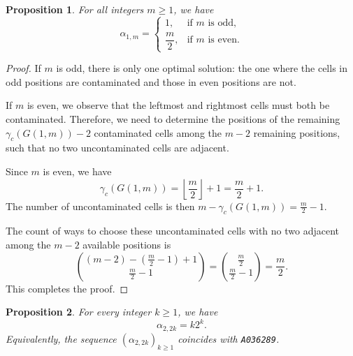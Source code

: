 \documentclass[letterpaper,12pt]{article}
\newtheorem{proposition}{Proposition}
\begin{document}
\begin{proposition}\label{proposition_nmbr_opt_solution}
For all integers $m \geq 1$, we have
\begin{equation}
        \alpha_{1,m} =
    \begin{cases}
        1, & \text{if $m$ is odd}, \\[4pt]
        \dfrac{m}{2}, & \text{if $m$ is even}.
    \end{cases}
\end{equation}
\end{proposition}

\begin{proof}
If $m$ is odd, there is only one optimal solution: the one where the cells in odd positions are contaminated and those in even positions are not.

If $m$ is even, we observe that the leftmost and rightmost cells must both be contaminated. Therefore, we need to determine the positions of the remaining $\gamma_c(G(1,m)) - 2$ contaminated cells among the $m - 2$ remaining positions, such that no two uncontaminated cells are adjacent.

Since $m$ is even, we have
\[
    \gamma_c(G(1,m)) = \left\lfloor \frac{m}{2} \right\rfloor + 1 = \frac{m}{2} + 1.
\]
The number of uncontaminated cells is then $m - \gamma_c(G(1,m)) = \frac{m}{2} - 1$.

The count of ways to choose these uncontaminated cells with no two adjacent among the $m - 2$ available positions is
\[
    \binom{(m - 2) - \left( \frac{m}{2} - 1 \right) + 1}{\frac{m}{2} - 1}
    = \binom{\frac{m}{2}}{\frac{m}{2} - 1}
    = \frac{m}{2}.
\]
This completes the proof.\qedhere
\end{proof}







\begin{proposition}\label{prop:a_2_2k}
For every integer \(k \ge 1\), we have
\begin{equation}
    \alpha_{2,2k}=k 2^{k}.
\end{equation}
Equivalently, the sequence \((\alpha_{2,2k})_{k\ge 1}\) coincides with \textup{\texttt{A036289}}.
\end{proposition}
\end{document}
